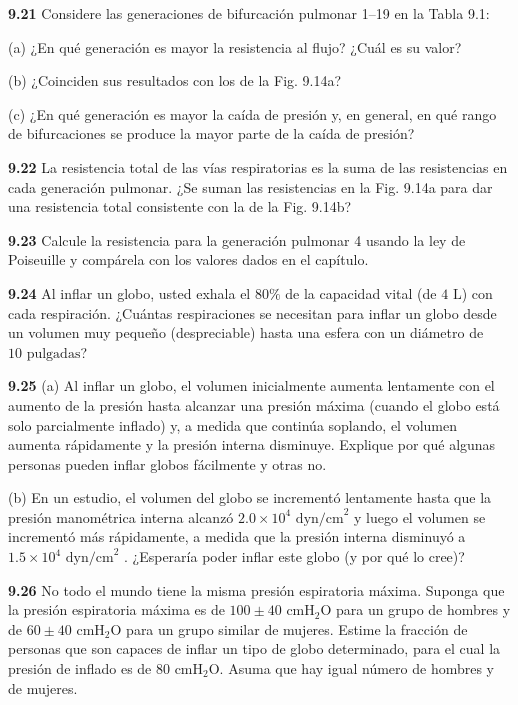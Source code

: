 \documentclass[12pt]{book}
\begin{document}
\noindent \textbf{9.21} Considere las generaciones de bifurcación pulmonar 1--19 en la Tabla 9.1:
\par\noindent (a) ¿En qué generación es mayor la resistencia al flujo? ¿Cuál es su valor?
\par\noindent (b) ¿Coinciden sus resultados con los de la Fig. 9.14a?
\par\noindent (c) ¿En qué generación es mayor la caída de presión y, en general, en qué rango de bifurcaciones se produce la mayor parte de la caída de presión?

\noindent \textbf{9.22} La resistencia total de las vías respiratorias es la suma de las resistencias en cada generación pulmonar. ¿Se suman las resistencias en la Fig. 9.14a para dar una resistencia total consistente con la de la Fig. 9.14b?

\noindent \textbf{9.23} Calcule la resistencia para la generación pulmonar 4 usando la ley de Poiseuille y compárela con los valores dados en el capítulo.

\noindent \textbf{9.24} Al inflar un globo, usted exhala el $80\%$ de la capacidad vital (de $4\text{ L}$) con cada respiración. ¿Cuántas respiraciones se necesitan para inflar un globo desde un volumen muy pequeño (despreciable) hasta una esfera con un diámetro de $10\text{ pulgadas}$?

\noindent \textbf{9.25} (a) Al inflar un globo, el volumen inicialmente aumenta lentamente con el aumento de la presión hasta alcanzar una presión máxima (cuando el globo está solo parcialmente inflado) y, a medida que continúa soplando, el volumen aumenta rápidamente y la presión interna disminuye. Explique por qué algunas personas pueden inflar globos fácilmente y otras no.
\par\noindent (b) En un estudio, el volumen del globo se incrementó lentamente hasta que la presión manométrica interna alcanzó $2.0 \times 10^4\text{ dyn/cm}^2$ y luego el volumen se incrementó más rápidamente, a medida que la presión interna disminuyó a $1.5 \times 10^4\text{ dyn/cm}^2$ \cite{17, 20}. ¿Esperaría poder inflar este globo (y por qué lo cree)?

\noindent \textbf{9.26} No todo el mundo tiene la misma presión espiratoria máxima. Suponga que la presión espiratoria máxima es de $100 \pm 40\text{ cmH}_2\text{O}$ para un grupo de hombres y de $60 \pm 40\text{ cmH}_2\text{O}$ para un grupo similar de mujeres. Estime la fracción de personas que son capaces de inflar un tipo de globo determinado, para el cual la presión de inflado es de $80\text{ cmH}_2\text{O}$. Asuma que hay igual número de hombres y de mujeres.
\end{document}
